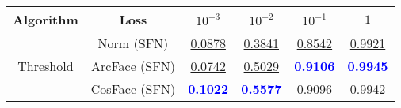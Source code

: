 \begin{table}[t]
\centering
\begin{tabularx}{.7\textwidth}{c|c|cccc}
\bf Algorithm & \bf Loss & $10^{-3}$ & $10^{-2}$ & $10^{-1}$ & $1$\\\hline\hline
\multirow{3}{*}{Threshold} & Norm (SFN) & \underline{0.0878} & \underline{0.3841} & \underline{0.8542} & \underline{0.9921}\\
 & ArcFace (SFN) & \underline{0.0742} & \underline{0.5029} & \textcolor{blue}{\bf 0.9106} & \textcolor{blue}{\bf 0.9945}\\
 & CosFace (SFN) & \textcolor{blue}{\bf 0.1022} & \textcolor{blue}{\bf 0.5577} & \underline{0.9096} & \underline{0.9942}\\
\hline
\end{tabularx}
\end{table}